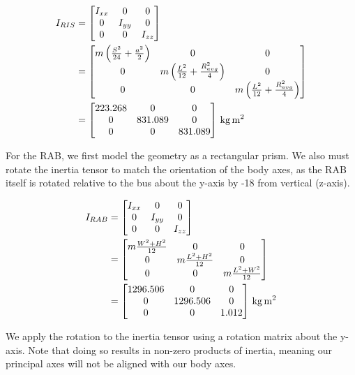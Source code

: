 \begin{align*}
I_{RIS} &=
\begin{bmatrix}
I_{xx} & 0 & 0 \\
0 & I_{yy} & 0 \\
0 & 0 & I_{zz}
\end{bmatrix} \\
&=
\begin{bmatrix}
m \left(\frac{S^{2}}{24} + \frac{a^{2}}{2}\right) & 0 & 0 \\
0 & m \left(\frac{L^{2}}{12} + \frac{R_{avg}^{2}}{4}\right) & 0 \\
0 & 0 & m \left(\frac{L^{2}}{12} + \frac{R_{avg}^{2}}{4}\right) 
\end{bmatrix} \\
&=
\qty[parse-numbers = false]{
\begin{bmatrix}
223.268 & 0 & 0 \\
0 & 831.089 & 0 \\
0 & 0 & 831.089 
\end{bmatrix}
}{\kilogram\metre\squared}
\end{align*}

For the RAB, we first model the geometry as a rectangular prism. We also must rotate the inertia tensor to match the orientation of the body axes, as the RAB itself is rotated relative to the bus about the y-axis by -18\degree{} from vertical (z-axis).

\begin{align*}
I_{RAB} &=
\begin{bmatrix}
I_{xx} & 0 & 0 \\
0 & I_{yy} & 0 \\
0 & 0 & I_{zz}
\end{bmatrix} \\
&=
\begin{bmatrix}
m \frac{W^{2} + H^{2}}{12} & 0 & 0 \\
0 & m \frac{L^{2} + H^{2}}{12} & 0 \\
0 & 0 & m \frac{L^{2} + W^{2}}{12} 
\end{bmatrix} \\
&=
\qty[parse-numbers = false]{
\begin{bmatrix}
1296.506 & 0 & 0 \\
0 & 1296.506 & 0 \\
0 & 0 & 1.012 
\end{bmatrix}
}{\kilogram\metre\squared}
\end{align*}

We apply the rotation to the inertia tensor using a rotation matrix about the y-axis. Note that doing so results in non-zero products of inertia, meaning our principal axes will not be aligned with our body axes.

